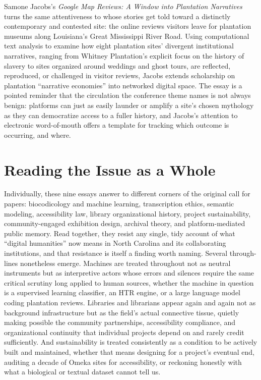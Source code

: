 \documentclass[final]{anthology-ch}  %
\begin{document}
Samone Jacobs's \textit{Google Map Reviews: A Window into Plantation Narratives} turns the same attentiveness to whose stories get told toward a distinctly contemporary and contested site: the online reviews visitors leave for plantation museums along Louisiana's Great Mississippi River Road. Using computational text analysis to examine how eight plantation sites' divergent institutional narratives, ranging from Whitney Plantation's explicit focus on the history of slavery to sites organized around weddings and ghost tours, are reflected, reproduced, or challenged in visitor reviews, Jacobs extends scholarship on plantation \enquote{narrative economies} into networked digital space. The essay is a pointed reminder that the circulation the conference theme names is not always benign: platforms can just as easily launder or amplify a site's chosen mythology as they can democratize access to a fuller history, and Jacobs's attention to electronic word-of-mouth offers a template for tracking which outcome is occurring, and where.

\section{Reading the Issue as a Whole}

Individually, these nine essays answer to different corners of the original call for papers: biocodicology and machine learning, transcription ethics, semantic modeling, accessibility law, library organizational history, project sustainability, community-engaged exhibition design, archival theory, and platform-mediated public memory. Read together, they resist any single, tidy account of what \enquote{digital humanities} now means in North Carolina and its collaborating institutions, and that resistance is itself a finding worth naming. Several through-lines nonetheless emerge. Machines are treated throughout not as neutral instruments but as interpretive actors whose errors and silences require the same critical scrutiny long applied to human sources, whether the machine in question is a supervised learning classifier, an HTR engine, or a large language model coding plantation reviews. Libraries and librarians appear again and again not as background infrastructure but as the field's actual connective tissue, quietly making possible the community partnerships, accessibility compliance, and organizational continuity that individual projects depend on and rarely credit sufficiently. And sustainability is treated consistently as a condition to be actively built and maintained, whether that means designing for a project's eventual end, auditing a decade of Omeka sites for accessibility, or reckoning honestly with what a biological or textual dataset cannot tell us.
\end{document}
